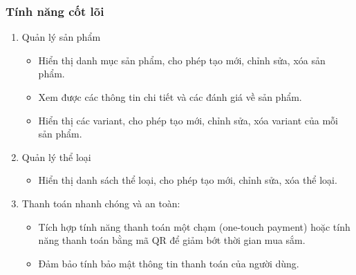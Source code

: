 \subsubsection{Tính năng cốt lõi}
\begin{enumerate}
    \item Quản lý sản phẩm
    \begin{itemize}
        \item Hiển thị danh mục sản phẩm, cho phép tạo mới, chỉnh sửa, xóa sản phẩm.
        \item Xem được các thông tin chi tiết và các đánh giá về sản phẩm.
        \item Hiển thị các variant, cho phép tạo mới, chỉnh sửa, xóa variant của mỗi sản phẩm.

    \end{itemize}
     \item Quản lý thể loại
    \begin{itemize}
        \item Hiển thị danh sách thể loại, cho phép tạo mới, chỉnh sửa, xóa thể loại.
    \end{itemize}
     \item Thanh toán nhanh chóng và an toàn:
    \begin{itemize}
        \item Tích hợp tính năng thanh toán một chạm (one-touch payment) hoặc tính năng thanh toán bằng mã QR để giảm bớt thời gian mua sắm.
        \item Đảm bảo tính bảo mật thông tin thanh toán của người dùng.
    \end{itemize}


\end{enumerate}
